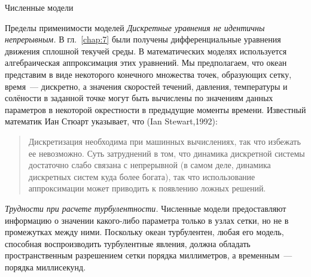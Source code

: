 \begin{chapter}{Численные модели}
\begin{section}{Пределы применимости моделей}
\emph{Дискретные уравнения не идентичны непрерывным.}  
В гл.~\ref{chap:7} были получены дифференциальные уравнения движения 
сплошной текучей среды. В математических моделях используется алгебраическая
аппроксимация этих уравнений. Мы предполагаем, что океан представим в виде
некоторого конечного множества точек, образующих сетку, время~--- дискретно,
а значения скоростей течений, давления, температуры и солёности в заданной 
точке могут быть вычислены по значениям данных параметров в некоторой 
окрестности в предыдущие моменты времени. Известный математик 
Иан Стюарт указывает, что (Ian Stewart,1992):
%
\begin{quote}
Дискретизация необходима при машинных вычислениях, так что избежать ее 
невозможно. Суть затруднений в том, что динамика дискретной системы
достаточно слабо связана с непрерывной (в самом деле, динамика дискретных
систем куда более богата), так что использование аппроксимации может приводить 
к появлению ложных решений.
%
\end{quote}

\emph{Трудности при расчете турбулентности.}  
Численные модели предоставляют информацию о значении какого-либо
параметра только в узлах сетки, но не в промежутках между ними. 
Поскольку океан турбулентен, любая его модель, способная воспроизводить
турбулентные явления, должна обладать пространственным разрешением сетки 
порядка миллиметров, а временным~--- порядка миллисекунд.
%


\end{section}
\end{chapter}
